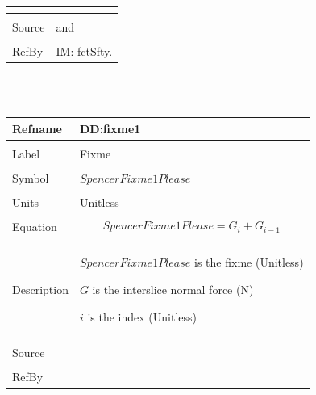 \documentclass[12pt]{article}
\begin{document}
\begin{minipage}{\textwidth}
\begin{tabular}{p{} p{}}
\begin{symbDescription}
                                                  \end{symbDescription}
                                                  \\ \midrule \\
                                                  Source & \cite{chen2005} and \cite{karchewski2012}
                                                           \\ \midrule \\
                                                           RefBy & \hyperref[IM:fctSfty]{IM: fctSfty}.
\\ \bottomrule \end{tabular}
\end{minipage}\\
~\newline
 \noindent \begin{minipage}{\textwidth}
\begin{tabular}{p{} p{}}
\toprule \textbf{Refname} & \textbf{DD:fixme1}
\label{DD:fixme1}
\\ \midrule \\
Label & Fixme
        \\ \midrule \\
        Symbol & $SpencerFixme1Please$
                 \\ \midrule \\
                 Units & Unitless
                         \\ \midrule \\
                         Equation & \begin{displaymath}
                                    SpencerFixme1Please=G_{i}+G_{i-1}
                                    \end{displaymath}
                                    \\ \midrule \\
                                    Description & \begin{symbDescription}
                                                  \item{$SpencerFixme1Please$ is the fixme (Unitless)}
                                                  \item{$G$ is the interslice normal force (N)}
                                                  \item{$i$ is the index (Unitless)}
                                                  \end{symbDescription}
                                                  \\ \midrule \\
                                                  Source & \\ \midrule \\
                                                           RefBy & 
\\ \bottomrule \end{tabular}
\end{minipage}\\
\end{document}
